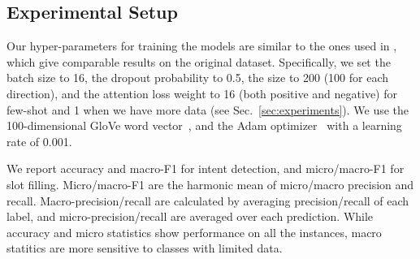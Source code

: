 

\subsection{Experimental Setup}
Our hyper-parameters for training the \NN models are similar to the ones used in \cite{liu2016attention}, which give comparable results on
the original dataset. Specifically, we set the batch size to 16, the dropout probability to 0.5, the \BLSTM size to 200 (100 for each
direction), and the attention loss weight to 16 (both positive and negative) for few-shot and 1 when we have more data (see
Sec.~\ref{sec:experiments}). We use the 100-dimensional GloVe word vector~\cite{pennington2014glove}, and the Adam optimizer~\cite{kingma2014adam} with a learning rate of 0.001.

We report accuracy and macro-F1 for intent detection, and micro/macro-F1 for slot filling.
Micro/macro-F1 are the harmonic mean of micro/macro precision and recall.
Macro-precision/recall are calculated by averaging precision/recall of each label, and micro-precision/recall are averaged over each prediction.
While accuracy and micro statistics show performance on all the instances, macro statitics are more sensitive to classes with limited data.

